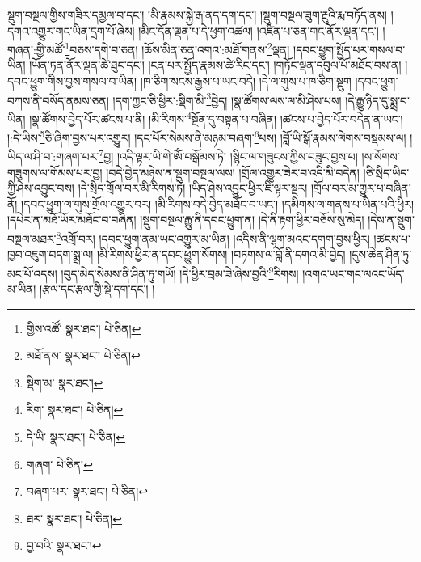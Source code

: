 སྡུག་བསྔལ་གྱིས་གཟིར་དམྱལ་བ་དང་། །མི་རྣམས་སྐྱེ་རྒ་ནད་དག་དང་། །སྡུག་བསྔལ་ཟུག་རྔུའི་རྨ་བཏོད་ནས། །དགའ་འགྱུར་གང་ཡིན་དྲག་པོ་ཞེས། །མིང་དོན་ལྡན་པ་དེ་ཕྱག་འཚལ། །འཛིན་པ་ཅན་གང་ནོར་ལྡན་དང་། །གཞན་:གྱི་མཚོ་\footnote{གྱིས་འཚོ་  སྣར་ཐང་།  པེ་ཅིན། }བཅས་དགེ་བ་ཅན། །ཆོས་མིན་ཅན་འགའ་:མཐོ་གནས་\footnote{མཐོ་ནས་  སྣར་ཐང་།  པེ་ཅིན། }ལྡན། །དབང་ཕྱུག་སྤྱོད་པར་གསལ་བ་ཡིན། །ཡོན་ཏན་ནོར་ལྡན་ཚེ་ཐུང་དང་། །ངན་པར་སྤྱོད་རྣམས་ཚེ་རིང་དང་། །གཏོང་ལྡན་དབུལ་པོ་མཐོང་བས་ན། །དབང་ཕྱུག་གིས་བྱས་གསལ་བ་ཡིན། །ཁ་ཅིག་སངས་རྒྱས་པ་ཡང་བདེ། །དེ་ལ་གུས་པ་ཁ་ཅིག་སྡུག །དབང་ཕྱུག་བཀས་ནི་བསོད་ནམས་ཅན། །དག་ཀྱང་ཅི་ཕྱིར་:སྡིག་མི་\footnote{སྡིག་མ་  སྣར་ཐང་། }བྱེད། །སྣ་ཚོགས་ལས་ལ་མི་ཤེས་པས། །དེ་རྒྱུ་ཉིད་དུ་སྨྲ་བ་ཡིན། །སྣ་ཚོགས་བྱེད་པོར་ཚངས་པ་ནི། །མི་རིགས་\footnote{རིག་  སྣར་ཐང་།  པེ་ཅིན། }སྔོན་དུ་བསྟན་པ་བཞིན། །ཚངས་པ་བྱེད་པོར་བདེན་ན་ཡང་། །:དེ་ཡིས་\footnote{དེ་ཡི་  སྣར་ཐང་།  པེ་ཅིན། }ཅི་ཞིག་བྱས་པར་འགྱུར། །དང་པོར་སེམས་ནི་མཉམ་བཞག་\footnote{གཞག་  པེ་ཅིན། }པས། །བློ་ཡི་སྒོ་རྣམས་ལེགས་བསྡམས་ལ། །ཡིད་ལ་ཤི་བ་:གཞག་པར་\footnote{བཞག་པར་  སྣར་ཐང་།  པེ་ཅིན། }བྱ། །འདི་ལྟར་ཡི་གེ་ཨོཾ་བསྒོམས་ཏེ། །སྙིང་ལ་གཟུངས་ཀྱིས་བཟུང་བྱས་པ། །ས་སོགས་གཟུགས་ལ་གོམས་པར་བྱ། །བདེ་བྱེད་མཉེས་ན་སྡུག་བསྔལ་ལས། །གྲོལ་འགྱུར་ཟེར་བ་འདི་མི་བདེན། །ཅི་སྲིད་ཡིད་ཀྱི་ཤེས་འབྱུང་བས། །དེ་སྲིད་གྲོལ་བར་མི་རིགས་ཏེ། །ཡིད་ཤེས་འབྱུང་ཕྱིར་ཇི་ལྟར་སྔར། །གྲོལ་བར་མ་གྱུར་པ་བཞིན་ནོ། །དབང་ཕྱུག་ལ་གུས་གྲོལ་འགྱུར་བར། །མི་རིགས་བདེ་བྱེད་མཐོང་བ་ཡང་། །དམིགས་ལ་གནས་པ་ཡིན་པའི་ཕྱིར། །དཔེར་ན་མཐོ་ཡོར་མཐོང་བ་བཞིན། །སྡུག་བསྔལ་རྒྱུ་ནི་དབང་ཕྱུག་ན། །དེ་ནི་རྟག་ཕྱིར་བཅོས་སུ་མེད། །དེས་ན་སྡུག་བསྔལ་མཐར་\footnote{ཐར་  སྣར་ཐང་།  པེ་ཅིན། }འགྲོ་བར། །དབང་ཕྱུག་ནམ་ཡང་འགྱུར་མ་ཡིན། །འདིས་ནི་ལྷག་མའང་དགག་བྱས་ཕྱིར། །ཚངས་པ་ཁྱབ་འཇུག་བདག་སྨྲ་ལ། །མི་རིགས་ཕྱིར་ན་དབང་ཕྱུག་སོགས། །བཏགས་ལ་བློ་ནི་དགའ་མི་བྱེད། །དུས་ཆེན་ཤིན་ཏུ་མང་པོ་འདས། །བུད་མེད་སེམས་ནི་ཤིན་ཏུ་གཡོ། །དེ་ཕྱིར་བྲམ་ཟེ་ཞེས་བྱའི་\footnote{བྱ་བའི་  སྣར་ཐང་། }རིགས། །འགའ་ཡང་གང་ལའང་ཡོད་མ་ཡིན། །རྩལ་དང་རྩལ་གྱི་སྡེ་དག་དང་། །
